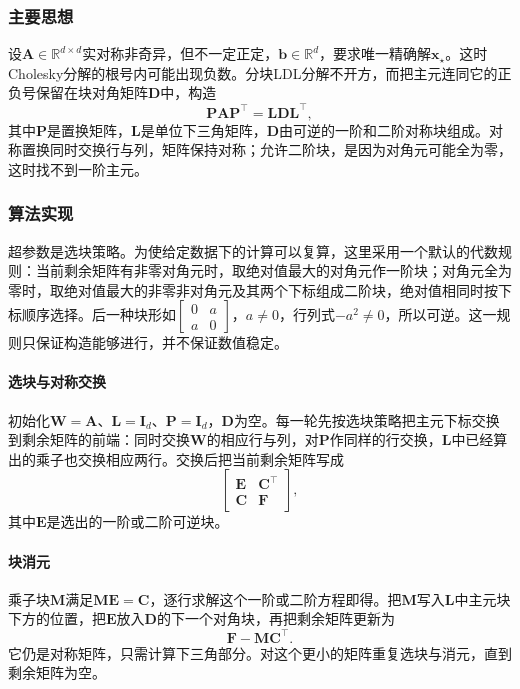 \subsubsection{主要思想}
设$\bm A\in\mathbb R^{d\times d}$实对称非奇异，但不一定正定，$\bm b\in\mathbb R^d$，要求唯一精确解$\bm x_\star$。这时Cholesky分解的根号内可能出现负数。分块LDL分解不开方，而把主元连同它的正负号保留在块对角矩阵$\bm D$中，构造
\begin{equation}
 \bm P\bm A\bm P^\top=\bm L\bm D\bm L^\top,
 \label{eq:ls-ldlt}
\end{equation}
其中$\bm P$是置换矩阵，$\bm L$是单位下三角矩阵，$\bm D$由可逆的一阶和二阶对称块组成。对称置换同时交换行与列，矩阵保持对称；允许二阶块，是因为对角元可能全为零，这时找不到一阶主元。

\subsubsection{算法实现}
超参数是选块策略。为使给定数据下的计算可以复算，这里采用一个默认的代数规则：当前剩余矩阵有非零对角元时，取绝对值最大的对角元作一阶块；对角元全为零时，取绝对值最大的非零非对角元及其两个下标组成二阶块，绝对值相同时按下标顺序选择。后一种块形如$\left[\begin{smallmatrix}0&a\\a&0\end{smallmatrix}\right]$，$a\neq0$，行列式$-a^2\neq0$，所以可逆。这一规则只保证构造能够进行，并不保证数值稳定。

\paragraph{选块与对称交换}
初始化$\bm W=\bm A$、$\bm L=\bm I_d$、$\bm P=\bm I_d$，$\bm D$为空。每一轮先按选块策略把主元下标交换到剩余矩阵的前端：同时交换$\bm W$的相应行与列，对$\bm P$作同样的行交换，$\bm L$中已经算出的乘子也交换相应两行。交换后把当前剩余矩阵写成
\[
 \begin{bmatrix}\bm E&\bm C^\top\\\bm C&\bm F\end{bmatrix},
\]
其中$\bm E$是选出的一阶或二阶可逆块。

\paragraph{块消元}
乘子块$\bm M$满足$\bm M\bm E=\bm C$，逐行求解这个一阶或二阶方程即得。把$\bm M$写入$\bm L$中主元块下方的位置，把$\bm E$放入$\bm D$的下一个对角块，再把剩余矩阵更新为
\[
 \bm F-\bm M\bm C^\top .
\]
它仍是对称矩阵，只需计算下三角部分。对这个更小的矩阵重复选块与消元，直到剩余矩阵为空。

